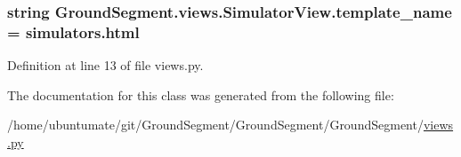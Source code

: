 \subsubsection[{template\+\_\+name}]{\setlength{\rightskip}{0pt plus 5cm}string Ground\+Segment.\+views.\+Simulator\+View.\+template\+\_\+name = \textquotesingle{}simulators.\+html\textquotesingle{}\hspace{0.3cm}{\ttfamily [static]}}\label{class_ground_segment_1_1views_1_1_simulator_view_af4d15c5a289475ea6f9058a7b8d1901a}


Definition at line 13 of file views.\+py.



The documentation for this class was generated from the following file\+:\begin{DoxyCompactItemize}
\item 
/home/ubuntumate/git/\+Ground\+Segment/\+Ground\+Segment/\+Ground\+Segment/\hyperlink{views_8py}{views.\+py}\end{DoxyCompactItemize}
